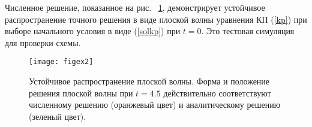Численное решение, показанное на рис. ~\ref{figex2}, демонстрирует устойчивое распространение точного решения в виде плоской волны уравнения КП (\ref {kp}) при выборе начального условия в виде (\ref{solkp}) при $t = 0$. Это тестовая симуляция для проверки схемы.

\begin{figure}
	\centering
	\texttt{[image: figex2]}
	\caption{Устойчивое распространение плоской волны. Форма и положение решения плоской волны при $ t = 4.5 $ действительно соответствуют численному решению (оранжевый цвет) и аналитическому решению (зеленый цвет).}\label{figex2}	
\end{figure}

